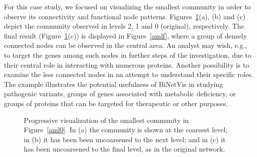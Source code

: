 \documentclass[runningheads]{llncs}
\begin{document}
\noindent For this case study, we focused on visualizing the smallest community in order to observe its connectivity and functional node patterns.
Figures~\ref{aml1}(a), (b) and (c) depict the community observed in levels 2, 1 and 0 (original), respectively.
The final result (Figure~\ref{aml1}(c)) is displayed in Figure~\ref{amlf},
where a group of densely connected nodes can be observed in the central area. An analyst may wish, e.g., to target the genes among such nodes
in further steps of the investigation,
due to their central role in interacting with numerous proteins.
Another possibility is to examine the less connected nodes in an attempt
to understand their specific roles. 
The example illustrates the potential usefulness of BiNetVis in studying pathogenic variants, groups of genes associated with metabolic deficiency,
or groups of proteins that can be targeted for therapeutic or other purposes.

\begin{figure}[!h]\centering
    \caption{Progressive visualization of the smallest community in Figure~\ref{aml0}. In (a) the community is shown at the coarsest level; in (b) it has been been uncoarsened to the next level; and in (c) it has been uncoarsened to the final level, as in the original network.}%
    \label{aml1}%
\end{figure}
\end{document}

